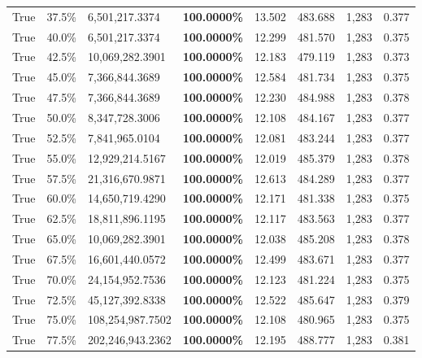 \begin{table}[H]
\begin{tabular}{lllrllll}
\cline{1-8}
True & 37.5\% & 6,501,217.3374 & \bfseries \color{red} 100.0000\% & 13.502 & 483.688 & 1,283 & 0.377 \\
\cline{1-8}
True & 40.0\% & 6,501,217.3374 & \bfseries \color{red} 100.0000\% & 12.299 & 481.570 & 1,283 & 0.375 \\
\cline{1-8}
True & 42.5\% & 10,069,282.3901 & \bfseries \color{red} 100.0000\% & 12.183 & 479.119 & 1,283 & 0.373 \\
\cline{1-8}
True & 45.0\% & 7,366,844.3689 & \bfseries \color{red} 100.0000\% & 12.584 & 481.734 & 1,283 & 0.375 \\
\cline{1-8}
True & 47.5\% & 7,366,844.3689 & \bfseries \color{red} 100.0000\% & 12.230 & 484.988 & 1,283 & 0.378 \\
\cline{1-8}
True & 50.0\% & 8,347,728.3006 & \bfseries \color{red} 100.0000\% & 12.108 & 484.167 & 1,283 & 0.377 \\
\cline{1-8}
True & 52.5\% & 7,841,965.0104 & \bfseries \color{red} 100.0000\% & 12.081 & 483.244 & 1,283 & 0.377 \\
\cline{1-8}
True & 55.0\% & 12,929,214.5167 & \bfseries \color{red} 100.0000\% & 12.019 & 485.379 & 1,283 & 0.378 \\
\cline{1-8}
True & 57.5\% & 21,316,670.9871 & \bfseries \color{red} 100.0000\% & 12.613 & 484.289 & 1,283 & 0.377 \\
\cline{1-8}
True & 60.0\% & 14,650,719.4290 & \bfseries \color{red} 100.0000\% & 12.171 & 481.338 & 1,283 & 0.375 \\
\cline{1-8}
True & 62.5\% & 18,811,896.1195 & \bfseries \color{red} 100.0000\% & 12.117 & 483.563 & 1,283 & 0.377 \\
\cline{1-8}
True & 65.0\% & 10,069,282.3901 & \bfseries \color{red} 100.0000\% & 12.038 & 485.208 & 1,283 & 0.378 \\
\cline{1-8}
True & 67.5\% & 16,601,440.0572 & \bfseries \color{red} 100.0000\% & 12.499 & 483.671 & 1,283 & 0.377 \\
\cline{1-8}
True & 70.0\% & 24,154,952.7536 & \bfseries \color{red} 100.0000\% & 12.123 & 481.224 & 1,283 & 0.375 \\
\cline{1-8}
True & 72.5\% & 45,127,392.8338 & \bfseries \color{red} 100.0000\% & 12.522 & 485.647 & 1,283 & 0.379 \\
\cline{1-8}
True & 75.0\% & 108,254,987.7502 & \bfseries \color{red} 100.0000\% & 12.108 & 480.965 & 1,283 & 0.375 \\
\cline{1-8}
True & 77.5\% & 202,246,943.2362 & \bfseries \color{red} 100.0000\% & 12.195 & 488.777 & 1,283 & 0.381 \\

\end{tabular}
\end{table}
